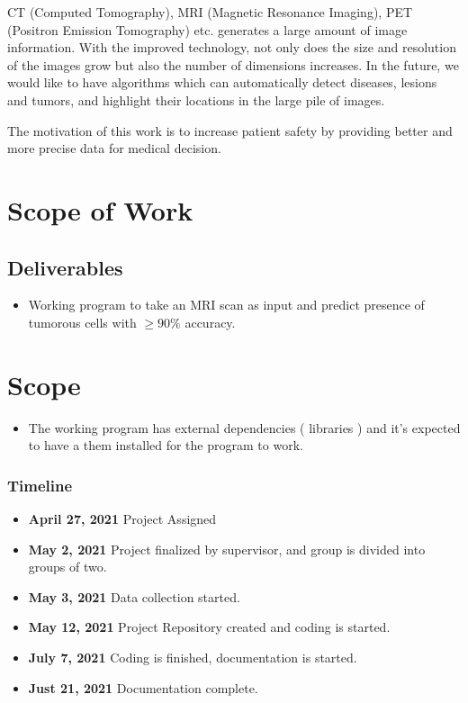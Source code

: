 \documentclass[10pt]{report}
\begin{document}
	CT (Computed Tomography), MRI (Magnetic Resonance Imaging), PET (Positron
	Emission Tomography) etc. generates a large amount of image information.
	With the improved technology, not only does the size and resolution of the
	images grow but also the number of dimensions increases. In the future, we
	would like to have algorithms which can automatically detect diseases,
	lesions and tumors, and highlight their locations in the large pile of
	images.

	The motivation of this work is to increase patient safety by providing
	better and more precise data for medical decision.

	\section[scope of work]{Scope of Work}
	\subsection[deliverables]{Deliverables}
	\begin{itemize}
		\item Working program to take an MRI scan as input and predict presence
			of tumorous cells with $\geq 90\%$ accuracy.
	\end{itemize}

	\section[scope]{Scope}
	\begin{itemize}
		\item The working program has external dependencies ( libraries ) and
			it's expected to have a them installed for the program to work.
	\end{itemize}

	\subsubsection[timeline]{Timeline}
	\begin{itemize}
		\item \textbf{April 27, 2021} Project Assigned
		\item \textbf{May 2, 2021} Project finalized by supervisor, and group is
			divided into groups of two.
		\item \textbf{May 3, 2021} Data collection started.
		\item \textbf{May 12, 2021} Project Repository created and coding is
			started.
		\item \textbf{July 7, 2021} Coding is finished, documentation is
			started.
		\item \textbf{Just 21, 2021} Documentation complete.
	\end{itemize}
\end{document}
